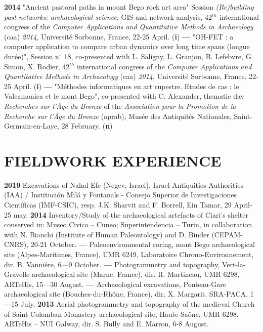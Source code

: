 \documentclass[11pt]{report} %
\begin{document}
\smallbreak
\textbf{2014 }"Ancient pastoral paths in mount Bego rock art area" Session \textit{(Re)building past networks: archaeological science}, GIS and network analysis, 42${}^{th}$ international congress of the \textit{Computer Applications and Quantitative Methods in Archaeology }(caa) \textit{2014}, Universit\'{e} Sorbonne, France, 22-25 April. (\textbf{i})\textbf{}
\smallbreak
\textbf{---  }"OH-FET : a computer application to compare urban dynamics over long time spans (longue dur\'{e}e)", Session n$\mathrm{{}^\circ}$ 18, co-presented with L. Saligny, L. Granjon, B. Lefebvre, G. Simon, X. Rodier, 42${}^{th}$ international congress of the \textit{Computer Applications and Quantitative Methods in Archaeology }(caa)\textit{ 2014}, Universit\'{e} Sorbonne, France, 22-25 April. (\textbf{i})
\smallbreak
\textbf{---  }"M\'{e}thodes informatiques en art rupestre. Etudes de cas : le Valcamonica et le mont Bego", co-presented with C. Alexander, thematic day \textit{Recherches sur l'\^{A}ge du Bronze }of the\textit{ Association pour la Promotion de la Recherche sur l'\^{A}ge du Bronze }(aprab), Mus\'{e}e des Antiquit\'{e}s Nationales, Saint-Germain-en-Laye, 28 February. (\textbf{n})

\section*{FIELDWORK EXPERIENCE}

\textbf{2019 }Excavations of Nahal Efe (Negev, Israel), Israel Antiquities Authorities (IAA) / Instituci\'{o}n Mil\'{a} y Fontanals - Consejo Superior de Investigaciones Cient\'{i}ficas (IMF-CSIC), resp. J.K. Sharvit and F. Borrell, Ein Tamar, 29 April-25 may.
\smallbreak
\textbf{2014 }Inventory/Study of the archaeological artefacts of Ciari's shelter conserved in: Museo Civico -- Cuneo; Superintendencia -- Turin, in collaboration with N. Bianchi (Institute of Human Paleontology) and D. Binder (CEPAM-CNRS), 20-21 October.
\smallbreak
\textbf{---  }Paleoenvironmental coring, mont Bego archaeological site (Alpes-Maritimes, France), UMR 6249, Laboratoire Chrono-Environnement, dir. B. Vanni\'{e}re, 6---9 October.
\smallbreak
\textbf{---  }Photogrammetry and topography, Vert-la-Gravelle archaeological site (Marne, France), dir. R. Martineau, UMR 6298, ARTeHis, 15---30 August.
\smallbreak
\textbf{---  }Archaeological excavations, Ponteau-Gare archaeological site (Bouches-du-Rh\^{o}ne, France), dir. X. Margarit, SRA-PACA, 1---15 July.\smallbreak
\textbf{2013 }Aerial\textbf{ }photogrammetry and topography of the medieval Church of Saint Colomban Monastery archaeological site, Haute-Sa\^{o}ne, UMR 6298, ARTeHis -- NUI Galway, dir. S. Bully and E. Marron, 6-8 August.
\end{document}
